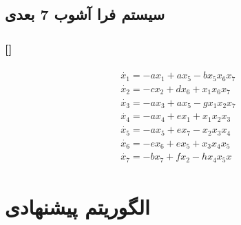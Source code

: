 \documentclass[xcolor=dvipsnames, professionalfonts, 11pt]{beamer}
\newcommand*{\makeframetitle}{\frametitle{\insertsection \hspace{0.1em} {\footnotesize [\insertsubsection]}}}
\begin{document}
\subsection{سیستم فرا آشوب 7 بعدی}
\begin{frame}
    \makeframetitle
    \begin{align}
        \begin{split}
            \dot{x_1} = -ax_1 + ax_5 - bx_5x_6x_7\\
            \dot{x_2} = -cx_2 + dx_6 + x_1x_6x_7\\
            \dot{x_3} = -ax_3 + ax_5 - gx_1x_2x_7\\
            \dot{x_4} = -ax_4 + ex_1 + x_1x_2x_3\\
            \dot{x_5} = -ax_5 + ex_7 - x_2x_3x_4\\
            \dot{x_6} = -ex_6 + ex_5 + x_3x_4x_5\\
            \dot{x_7} = -bx_7 + fx_2 - hx_4x_5x
        \end{split}
    \end{align}
\end{frame}
\section{الگوریتم پیشنهادی}
\end{document}
